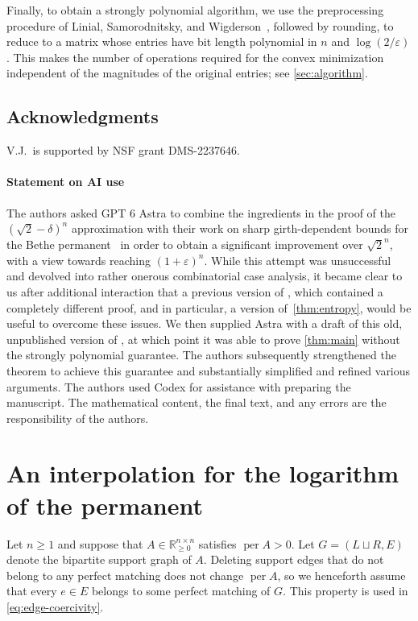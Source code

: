 \documentclass[11pt,reqno,letterpaper]{amsart}
\numberwithin{equation}{section}
\theoremstyle{definition}
\theoremstyle{remark}
\newcommand{\R}{\mathbb R}
\DeclareMathOperator{\per}{per}
\begin{document}
Finally, to obtain a strongly polynomial algorithm, we use
the preprocessing procedure of Linial, Samorodnitsky, and
Wigderson~\cite{LSW}, followed by rounding, to reduce to a
matrix whose entries have bit length polynomial in $n$ and
$\log(2/\varepsilon)$. This makes the number of operations
required for the convex minimization independent of the
magnitudes of the original entries; see \cref{sec:algorithm}.

\subsection{Acknowledgments} V.J.~is supported by NSF grant DMS-2237646.

\medskip

\paragraph{\bf Statement on AI use} The authors asked GPT 6 Astra to combine the ingredients in the proof of the $(\sqrt{2}-\delta)^n$ approximation \cite{Anari, NP} with their work on sharp girth-dependent bounds for the Bethe permanent~\cite{DJ} in order to obtain a significant improvement over $\sqrt{2}^n$, with a view towards reaching $(1+\varepsilon)^n$. While this attempt was unsuccessful and devolved into rather onerous combinatorial case analysis, it became clear to us after additional interaction that a previous version of \cite{DJ}, which contained a completely different proof, and in particular, a version of~\cref{thm:entropy}, would be useful to overcome these issues. We then supplied Astra with a draft of this old, unpublished version of \cite{DJ}, at which point it was able to prove  \cref{thm:main} without the strongly polynomial guarantee. The authors subsequently strengthened the theorem to achieve this guarantee and substantially simplified and refined various arguments. The authors used Codex for assistance with preparing the manuscript. The mathematical content, the final text, and any errors are the responsibility of the authors.  

\section{An interpolation for the logarithm of the permanent}
\label{sec:entropy}

Let $n\geq1$ and suppose that $A\in\R_{\geq0}^{n\times n}$ satisfies
$\per A>0$. Let $G=(L\sqcup R,E)$ denote the bipartite support graph
of $A$. Deleting support edges that do not belong to any perfect
matching does not change $\per A$, so we henceforth assume that every
$e\in E$ belongs to some perfect matching of $G$.  This property is
used in \cref{eq:edge-coercivity}.
\end{document}
